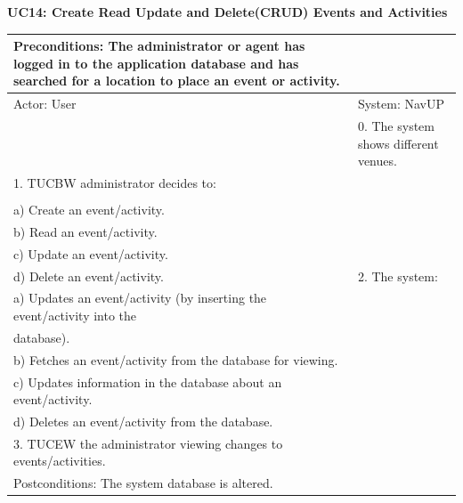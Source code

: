 \documentclass{article}
\begin{document}
		
        		\centering
					\textbf{UC14: Create Read Update and Delete(CRUD) Events and Activities}\\
       		 \small
       		 \begin{tabular}{|p{8cm}|p{8cm}|}
       		 \hline
       		 Preconditions: The administrator or agent has logged in to the application database and has searched for a location to place an event or activity.& \\
       		 \hline
       		 Actor: User & System: NavUP \\
        		\hline
       		 & 0.	The system shows different venues.\\
       		 \hline
       		1.	TUCBW administrator decides to:\\

\\a)	Create an event/activity.
\\b)	Read an event/activity.
\\c)	Update an event/activity.
\\d)	Delete an event/activity.
 &2.	The system:

\\a)	Updates an event/activity (by inserting the event/activity into the \\database).
\\b)	Fetches an event/activity from the database for viewing.
\\c)	Updates information in the database about an event/activity.
\\d)	Deletes an event/activity from the database.
\\
        		\hline
       		3.	TUCEW the administrator viewing changes to events/activities.&\\
       		 \hline
        		Postconditions: The system database is altered. & \\
        		\hline
        \end{tabular} 
   
\end{document}

